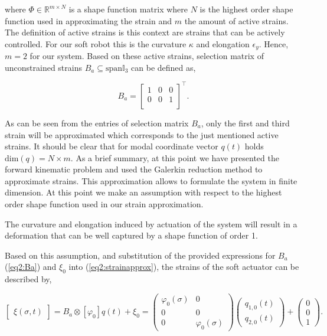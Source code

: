 where $\Phi \in \mathbb{R}^{m \times N}$ is a shape function matrix where $N$ is the highest order shape function used in approximating the strain and $m$ the amount of active strains. The definition of active strains is this context are strains that can be actively controlled. For our soft robot this is the curvature $\kappa$ and elongation $\epsilon_y$. Hence, $m=2$ for our system. Based on these active strains, selection matrix of unconstrained strains $B_a \subseteq \text{span} \mathbb{I}_3$ can be defined as,

\begin{equation}
    B_a = \begin{bmatrix}
    1 & 0 & 0  \\
    0 & 0 & 1  \\
    \end{bmatrix}^\top.
    \label{eq2:Ba}
\end{equation}

As can be seen from the entries of selection matrix $B_a$, only the first and third strain will be approximated which corresponds to the just mentioned active strains. It should be clear that for modal coordinate vector $q(t)$ holds $\text{dim}(q) = N \times m $. As a brief summary, at this point we have presented the forward kinematic problem and used the Galerkin reduction method to approximate strains. This approximation allows to formulate the system in finite dimension. At this point we make an assumption with respect to the highest order shape function used in our strain approximation.

\begin{theorem}
The curvature and elongation induced by actuation of the system will result in a deformation that can be well captured by a shape function of order 1.
\end{theorem}

\newpage 

Based on this assumption, and substitution of the provided expressions for $B_a$ (\ref{eq2:Ba}) and $\xi_0$ into (\ref{eq2:strainapprox}), the strains of the soft actuator can be described by,


\begin{equation}
    \begin{bmatrix}\xi(\sigma,t)\end{bmatrix} =B_a \otimes [\varphi_0]q(t) + \xi_0  =  \begin{pmatrix}
    \varphi_0(\sigma) & 0  \\
    0 & 0  \\
    0 & \varphi_0 (\sigma)
    \end{pmatrix} \begin{pmatrix} q_{1,0}(t) \\  q_{2,0}(t) \end{pmatrix} +  \begin{pmatrix} 0 \\ 0 \\ 1   \end{pmatrix}.
\label{eq2:xishape}
\end{equation}

